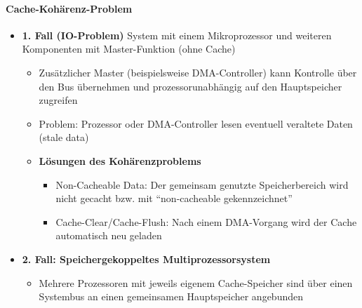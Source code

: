 	\paragraph{Cache-Kohärenz-Problem}
		\begin{itemize}
			\item \textbf{1. Fall (IO-Problem)} System mit einem Mikroprozessor und weiteren Komponenten mit Master-Funktion (ohne Cache)
			\begin{itemize}
				\item Zusätzlicher Master (beispielsweise DMA-Controller) kann Kontrolle über den Bus übernehmen und prozessorunabhängig auf den Hauptspeicher zugreifen
				\item Problem: Prozessor oder DMA-Controller lesen eventuell veraltete Daten (stale data)
				\item \textbf{Lösungen des Kohärenzproblems}
				\begin{itemize}
					\item Non-Cacheable Data: Der gemeinsam genutzte Speicherbereich wird nicht gecacht bzw. mit "`non-cacheable gekennzeichnet"'
					\item Cache-Clear/Cache-Flush: Nach einem DMA-Vorgang wird der Cache automatisch neu geladen
				\end{itemize}
			\end{itemize}
			\item \textbf{2. Fall: Speichergekoppeltes Multiprozessorsystem}
			\begin{itemize}
				\item Mehrere Prozessoren mit jeweils eigenem Cache-Speicher sind über einen Systembus an einen gemeinsamen Hauptspeicher angebunden
			\end{itemize}
		\end{itemize}

